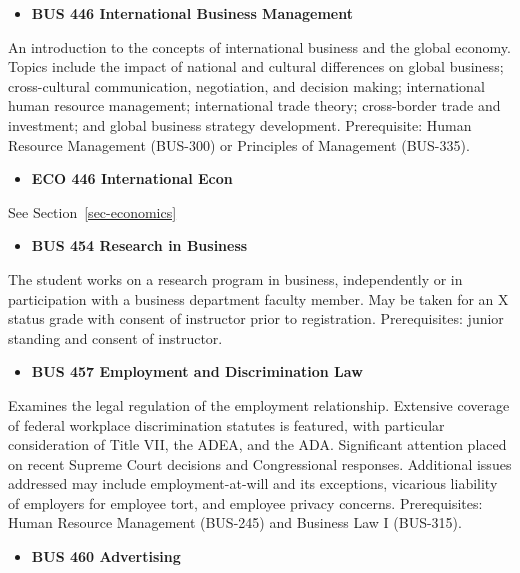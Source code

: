 \documentclass[
  letterpaper,
]{scrbook}
\providecommand{\tightlist}{%
  \setlength{\itemsep}{0pt}\setlength{\parskip}{0pt}}
\begin{document}
\begin{itemize}
\tightlist
\item
  \textbf{BUS 446 International Business Management}
\end{itemize}

An introduction to the concepts of international business and the global
economy. Topics include the impact of national and cultural differences
on global business; cross-cultural communication, negotiation, and
decision making; international human resource management; international
trade theory; cross-border trade and investment; and global business
strategy development. Prerequisite: Human Resource Management (BUS-300)
or Principles of Management (BUS-335).

\begin{itemize}
\tightlist
\item
  \textbf{ECO 446 International Econ}
\end{itemize}

See Section~\ref{sec-economics}

\begin{itemize}
\tightlist
\item
  \textbf{BUS 454 Research in Business}
\end{itemize}

The student works on a research program in business, independently or in
participation with a business department faculty member. May be taken
for an X status grade with consent of instructor prior to registration.
Prerequisites: junior standing and consent of instructor.

\begin{itemize}
\tightlist
\item
  \textbf{BUS 457 Employment and Discrimination Law}
\end{itemize}

Examines the legal regulation of the employment relationship. Extensive
coverage of federal workplace discrimination statutes is featured, with
particular consideration of Title VII, the ADEA, and the ADA.
Significant attention placed on recent Supreme Court decisions and
Congressional responses. Additional issues addressed may include
employment-at-will and its exceptions, vicarious liability of employers
for employee tort, and employee privacy concerns. Prerequisites: Human
Resource Management (BUS-245) and Business Law I (BUS-315).

\begin{itemize}
\tightlist
\item
  \textbf{BUS 460 Advertising}
\end{itemize}
\end{document}
